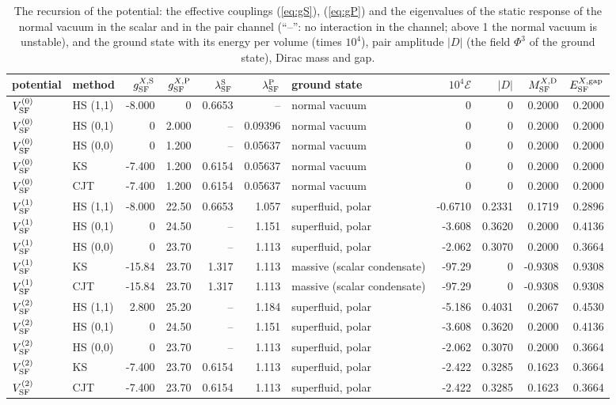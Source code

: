\documentclass[aps,prd,onecolumn,superscriptaddress,nofootinbib,floatfix,longbibliography]{revtex4-2}
\newcommand{\SF}{{\rm SF}}
\begin{document}
\begin{table}[h]
\caption{\label{tab:recursion}The recursion of the potential: the effective couplings (\ref{eq:gS}), (\ref{eq:gP}) and the
eigenvalues of the static response of the normal vacuum in the scalar and in the pair channel (``--'': no interaction in the
channel; above 1 the normal vacuum is unstable), and the ground state with its energy per volume (times $10^4$), pair
amplitude $|D|$ (the field $\Phi^3$ of the ground state), Dirac mass and gap.}
\begin{ruledtabular}
\begin{tabular}{llrrrrlrrrr}
potential & method & $g^{X,{\rm S}}_\SF$ & $g^{X,{\rm P}}_\SF$ & $\lambda^{\rm S}_\SF$ & $\lambda^{\rm P}_\SF$ & ground state & $10^4\mathcal E$ & $|D|$ & $M^{X,{\rm D}}_\SF$ & $E^{X,{\rm gap}}_\SF$ \\
\hline
$V^{(0)}_\SF$ & HS (1,1) & -8.000 & 0 & 0.6653 & -- & normal vacuum & 0 & 0 & 0.2000 & 0.2000 \\
$V^{(0)}_\SF$ & HS (0,1) & 0 & 2.000 & -- & 0.09396 & normal vacuum & 0 & 0 & 0.2000 & 0.2000 \\
$V^{(0)}_\SF$ & HS (0,0) & 0 & 1.200 & -- & 0.05637 & normal vacuum & 0 & 0 & 0.2000 & 0.2000 \\
$V^{(0)}_\SF$ & KS & -7.400 & 1.200 & 0.6154 & 0.05637 & normal vacuum & 0 & 0 & 0.2000 & 0.2000 \\
$V^{(0)}_\SF$ & CJT & -7.400 & 1.200 & 0.6154 & 0.05637 & normal vacuum & 0 & 0 & 0.2000 & 0.2000 \\
$V^{(1)}_\SF$ & HS (1,1) & -8.000 & 22.50 & 0.6653 & 1.057 & superfluid, polar & -0.6710 & 0.2331 & 0.1719 & 0.2896 \\
$V^{(1)}_\SF$ & HS (0,1) & 0 & 24.50 & -- & 1.151 & superfluid, polar & -3.608 & 0.3620 & 0.2000 & 0.4136 \\
$V^{(1)}_\SF$ & HS (0,0) & 0 & 23.70 & -- & 1.113 & superfluid, polar & -2.062 & 0.3070 & 0.2000 & 0.3664 \\
$V^{(1)}_\SF$ & KS & -15.84 & 23.70 & 1.317 & 1.113 & massive (scalar condensate) & -97.29 & 0 & -0.9308 & 0.9308 \\
$V^{(1)}_\SF$ & CJT & -15.84 & 23.70 & 1.317 & 1.113 & massive (scalar condensate) & -97.29 & 0 & -0.9308 & 0.9308 \\
$V^{(2)}_\SF$ & HS (1,1) & 2.800 & 25.20 & -- & 1.184 & superfluid, polar & -5.186 & 0.4031 & 0.2067 & 0.4530 \\
$V^{(2)}_\SF$ & HS (0,1) & 0 & 24.50 & -- & 1.151 & superfluid, polar & -3.608 & 0.3620 & 0.2000 & 0.4136 \\
$V^{(2)}_\SF$ & HS (0,0) & 0 & 23.70 & -- & 1.113 & superfluid, polar & -2.062 & 0.3070 & 0.2000 & 0.3664 \\
$V^{(2)}_\SF$ & KS & -7.400 & 23.70 & 0.6154 & 1.113 & superfluid, polar & -2.422 & 0.3285 & 0.1623 & 0.3664 \\
$V^{(2)}_\SF$ & CJT & -7.400 & 23.70 & 0.6154 & 1.113 & superfluid, polar & -2.422 & 0.3285 & 0.1623 & 0.3664 \\
\end{tabular}
\end{ruledtabular}
\end{table}
\end{document}
